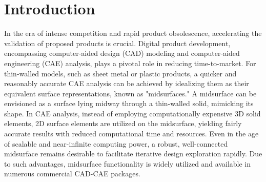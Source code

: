 \section{Introduction}\label{sec:intro}


In the era of intense competition and rapid product obsolescence, accelerating the validation of proposed products is crucial. Digital product development, encompassing computer-aided design (CAD) modeling and computer-aided engineering (CAE) analysis, plays a pivotal role in reducing time-to-market. For thin-walled models, such as sheet metal or plastic products, a quicker and reasonably accurate CAE analysis can be achieved by idealizing them as their equivalent surface representations, known as "midsurfaces." A midsurface can be envisioned as a surface lying midway through a thin-walled solid, mimicking its shape. In CAE analysis, instead of employing computationally expensive 3D solid elements, 2D surface elements are utilized on the midsurface, yielding fairly accurate results with reduced computational time and resources. Even in the age of scalable and near-infinite computing power, a robust, well-connected midsurface remains desirable to facilitate iterative design exploration rapidly. Due to such advantages, midsurface functionality is widely utilized and available in numerous commercial CAD-CAE packages.


